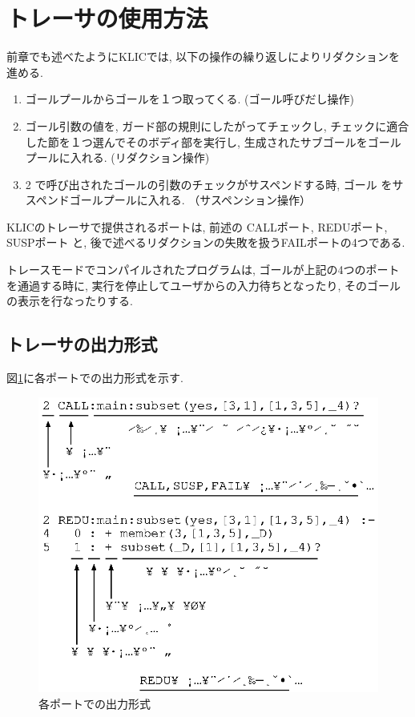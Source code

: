 \documentclass[a4,titlepage]{jsreport}
\begin{document}
\section{トレーサの使用方法}

前章でも述べたようにKLICでは, 以下の操作の繰り返しによりリダクションを進める.  

\begin{enumerate}
\item ゴールプールからゴールを１つ取ってくる.  (ゴール呼びだし操作)
\item ゴール引数の値を, ガード部の規則にしたがってチェックし, チェックに適合した節を１つ選んでそのボディ部を実行し, 生成されたサブゴールをゴールプールに入れる.  (リダクション操作)
\item 2 で呼び出されたゴールの引数のチェックがサスペンドする時, ゴール
をサスペンドゴールプールに入れる.  （サスペンション操作）
\end{enumerate}


KLICのトレーサで提供されるポートは, 前述の CALLポート, REDUポート, SUSPポート
と, 後で述べるリダクションの失敗を扱うFAILポートの4つである.  

トレースモードでコンパイルされたプログラムは, ゴールが上記の4つのポート
を通過する時に, 実行を停止してユーザからの入力待ちとなったり, 
そのゴールの表示を行なったりする.  

\subsection{トレーサの出力形式}


図\ref{portout}に各ポートでの出力形式を示す.  

\begin{figure}[htb]
\begin{center}
\includegraphics[width=.6\textwidth]{fig/portout1.eps}
\end{center}
\caption{各ポートでの出力形式}
\label{portout}
\end{figure}
\end{document}
